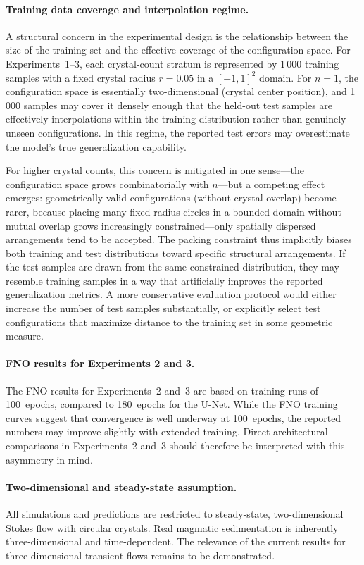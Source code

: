 \paragraph{Training data coverage and interpolation regime.}
A structural concern in the experimental design is the relationship between the size of the training set and the effective coverage of the configuration space. For Experiments~1--3, each crystal-count stratum is represented by 1\,000 training samples with a fixed crystal radius $r = 0.05$ in a $[-1,1]^2$ domain. For $n = 1$, the configuration space is essentially two-dimensional (crystal center position), and 1\,000 samples may cover it densely enough that the held-out test samples are effectively interpolations within the training distribution rather than genuinely unseen configurations. In this regime, the reported test errors may overestimate the model's true generalization capability.

For higher crystal counts, this concern is mitigated in one sense—the configuration space grows combinatorially with $n$—but a competing effect emerges: geometrically valid configurations (without crystal overlap) become rarer, because placing many fixed-radius circles in a bounded domain without mutual overlap grows increasingly constrained—only spatially dispersed arrangements tend to be accepted. The packing constraint thus implicitly biases both training and test distributions toward specific structural arrangements. If the test samples are drawn from the same constrained distribution, they may resemble training samples in a way that artificially improves the reported generalization metrics. A more conservative evaluation protocol would either increase the number of test samples substantially, or explicitly select test configurations that maximize distance to the training set in some geometric measure.

\paragraph{FNO results for Experiments 2 and 3.} The FNO results for Experiments~2 and~3 are based on training runs of 100~epochs, compared to 180~epochs for the U-Net. While the FNO training curves suggest that convergence is well underway at 100~epochs, the reported numbers may improve slightly with extended training. Direct architectural comparisons in Experiments~2 and~3 should therefore be interpreted with this asymmetry in mind.

\paragraph{Two-dimensional and steady-state assumption.} All simulations and predictions are restricted to steady-state, two-dimensional Stokes flow with circular crystals. Real magmatic sedimentation is inherently three-dimensional and time-dependent. The relevance of the current results for three-dimensional transient flows remains to be demonstrated.

